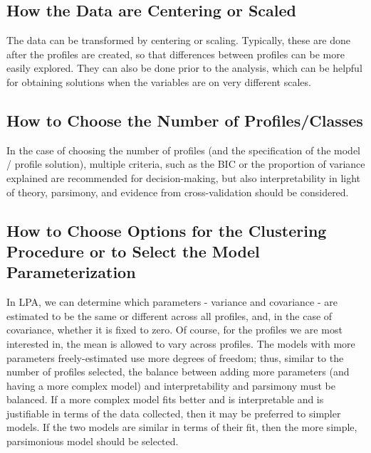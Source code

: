 \documentclass[man]{apa6}
\begin{document}
\hypertarget{how-the-data-are-centering-or-scaled}{%
\subsection{How the Data are Centering or Scaled}\label{how-the-data-are-centering-or-scaled}}

The data can be transformed by centering or scaling. Typically, these are done
after the profiles are created, so that differences between profiles can be more
easily explored. They can also be done prior to the analysis, which can be
helpful for obtaining solutions when the variables are on very different
scales.

\hypertarget{how-to-choose-the-number-of-profilesclasses}{%
\subsection{How to Choose the Number of Profiles/Classes}\label{how-to-choose-the-number-of-profilesclasses}}

In the case of choosing the number of profiles (and the specification of the
model / profile solution), multiple criteria, such as the BIC or the proportion
of variance explained are recommended for decision-making, but also
interpretability in light of theory, parsimony, and evidence from
cross-validation should be considered.

\hypertarget{how-to-choose-options-for-the-clustering-procedure-or-to-select-the-model-parameterization}{%
\subsection{How to Choose Options for the Clustering Procedure or to Select the Model Parameterization}\label{how-to-choose-options-for-the-clustering-procedure-or-to-select-the-model-parameterization}}

In LPA, we can determine which parameters - variance
and covariance - are estimated to be the same or different across all profiles,
and, in the case of covariance, whether it is fixed to zero. Of course, for the
profiles we are most interested in, the mean is allowed to vary across profiles.
The models with more parameters freely-estimated use more degrees of freedom;
thus, similar to the number of profiles selected, the balance between adding
more parameters (and having a more complex model) and interpretability and
parsimony must be balanced. If a more complex model fits better and is
interpretable and is justifiable in terms of the data collected, then it may be
preferred to simpler models. If the two models are similar in terms of their
fit, then the more simple, parsimonious model should be selected.
\end{document}
